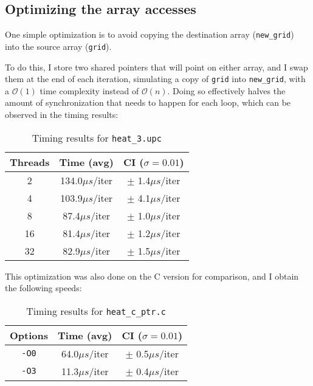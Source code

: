 \documentclass[12pt]{article}
\newcommand{\us}[0]{${\mu}s$}
\begin{document}
\newpage

\subsection{Optimizing the array accesses}
\label{sec:ptrswap}

One simple optimization is to avoid copying the destination array (\texttt{new\_grid}) into the source array (\texttt{grid}).

To do this, I store two shared pointers that will point on either array, and I swap them at the end of each iteration, simulating a copy of \texttt{grid} into \texttt{new\_grid}, with a $\mathcal{O}(1)$ time complexity instead of $\mathcal{O}(n)$.
Doing so effectively halves the amount of synchronization that needs to happen for each loop, which can be observed in the timing results:

\begin{table}[ht]
  \centering\begin{tabular}{|c|c|c|}
    \hline
    Threads & Time (avg) & CI ($\sigma=0.01$) \\
    \hline
    2 & 134.0\us/iter & $\pm$ 1.4\us/iter \\
    4 & 103.9\us/iter & $\pm$ 4.1\us/iter \\
    8 & 87.4\us/iter & $\pm$ 1.0\us/iter \\
    16 & 81.4\us/iter & $\pm$ 1.2\us/iter \\
    32 & 82.9\us/iter & $\pm$ 1.5\us/iter \\
    \hline
  \end{tabular}
  \caption{Timing results for \texttt{heat\_3.upc}}
  \label{tab:heat3}
\end{table}

This optimization was also done on the C version for comparison, and I obtain the following speeds:

\begin{table}[h]
  \centering\begin{tabular}{|c|c|c|}
    \hline
    Options & Time (avg) & CI ($\sigma=0.01$) \\
    \hline
    \texttt{-O0} & 64.0\us/iter & $\pm$ 0.5\us/iter \\
    \texttt{-O3} & 11.3\us/iter & $\pm$ 0.4\us/iter \\
    \hline
  \end{tabular}
  \caption{Timing results for \texttt{heat\_c\_ptr.c}}
  \label{tab:heatcptr}
\end{table}
\end{document}
